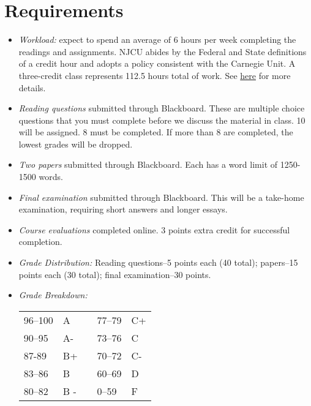 \documentclass[article,oneside]{memoir}
\begin{document}
\section{Requirements}

\begin{itemize}


\item \textit{Workload:} expect to spend an average of 6 hours per week completing the readings and assignments. NJCU abides by the Federal and State definitions of a credit hour and adopts a policy consistent with the Carnegie Unit. A three-credit class represents 112.5 hours total of work. See \href{http://scottoconnor.org/resources/Credit.pdf}{here} for more details.




\item \textit{Reading questions} submitted through Blackboard. These are multiple choice questions that you must complete before we discuss the material in class. 10 will be assigned. 8 must be completed. If more than 8 are completed, the lowest grades will be dropped. 



\item \textit{Two papers} submitted through Blackboard. Each has a word limit of 1250-1500 words. 

\item \textit{Final examination} submitted through Blackboard. This will be a take-home examination, requiring short answers and longer essays.  

\item \textit{Course evaluations} completed online. 3 points extra credit for successful completion.

\item \textit{Grade Distribution:} Reading questions--5 points each (40 total); papers--15 points each (30 total); final examination--30 points.



\item \textit{Grade Breakdown:}

 \begin{tabular}{ | l | l | p{2cm} | l | l | }
    \hline 
96--100 & A  & &  77--79 &  C+ \\  
90--95 & A- & &  73--76 & C \\
87-89 & B+ &  &  70--72 & C- \\ 
83--86 & B  & &  60--69 & D\\
80--82 & B - & & 0--59 & F\\ \hline
    \end{tabular}


\end{itemize}
\end{document}
